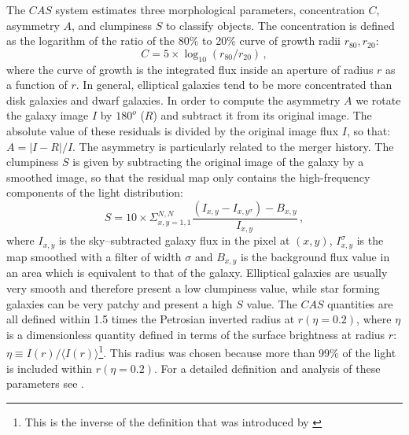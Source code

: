 The $CAS$ system estimates three morphological parameters, concentration $C$, asymmetry $A$, and clumpiness $S$ to classify objects. The concentration is defined as the logarithm of the ratio of the $80\%$ to 20\% curve of growth radii $r_{80}, r_{20}$:
\begin{equation}
C=5\times \log_{10}(r_{80}/r_{20})\,,
\end{equation}
where the curve of growth is the integrated flux inside an aperture of radius $r$ as a function of $r$.
In general, elliptical galaxies tend to be more concentrated than disk galaxies and dwarf galaxies. In order to compute the asymmetry $A$ we rotate the galaxy image $I$ by $180^o$ ($R$) and subtract it from its original image. The absolute value of these residuals is divided by the original image flux $I$, so that: $A=|I-R|/I$. The asymmetry is particularly related to the merger history. The clumpiness $S$ is given by subtracting the original image of the galaxy by a smoothed image, so that the residual map only contains the high-frequency components of the light distribution:
\begin{equation}
S=10 \times \Sigma^{N,N}_{x,y=1,1}\frac{(I_{x,y}-I_{x,y^{\sigma}})-B_{x,y}}{I_{x,y}}\,,
\end{equation}
where $I_{x,y}$ is the sky--subtracted galaxy flux in the pixel at $(x,y)$, $I_{x,y}^{\sigma}$ is the map smoothed with a filter of width $\sigma$ and $B_{x,y}$ is the background flux value in an area which is equivalent to that of the galaxy. Elliptical galaxies are usually very smooth and therefore present a low clumpiness value, while star forming galaxies can be very patchy and present a high $S$ value.
The $CAS$ quantities are all defined within 1.5 times the Petrosian inverted radius at $r(\eta=0.2)$, where $\eta$ is a dimensionless quantity defined in terms of the surface brightness at radius $r$: $\eta\equiv I(r)/\langle I(r)\rangle$\footnote{This is the inverse of the definition that was introduced by \citet{petrosian}}. This radius was chosen because more than 99\% of the light is included within $r(\eta= 0.2)$. For a detailed definition and analysis of these parameters see \citet{Bershady}.

